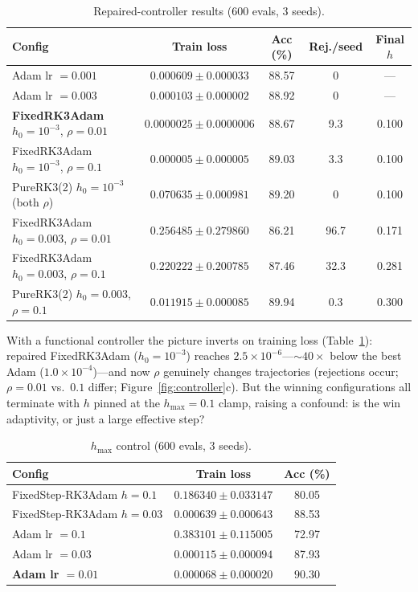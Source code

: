 \documentclass{article}
\newcommand{\hmax}{h_{\max}}
\begin{document}
\begin{table}[t]
\caption{Repaired-controller results (600 evals, 3 seeds).}
\label{tab:repaired}
\vskip 0.1in
\centering
\small
\begin{tabular}{lcccc}
\toprule
Config & Train loss & Acc (\%) & Rej./seed & Final $h$ \\
\midrule
Adam lr $=0.001$ & $0.000609 \pm 0.000033$ & 88.57 & 0 & --- \\
Adam lr $=0.003$ & $0.000103 \pm 0.000002$ & 88.92 & 0 & --- \\
\textbf{FixedRK3Adam} $h_0{=}10^{-3}$, $\rho{=}0.01$ & $\mathbf{0.0000025 \pm 0.0000006}$ & 88.67 & 9.3 & 0.100 \\
FixedRK3Adam $h_0{=}10^{-3}$, $\rho{=}0.1$ & $0.000005 \pm 0.000005$ & 89.03 & 3.3 & 0.100 \\
PureRK3(2) $h_0{=}10^{-3}$ (both $\rho$) & $0.070635 \pm 0.000981$ & 89.20 & 0 & 0.100 \\
FixedRK3Adam $h_0{=}0.003$, $\rho{=}0.01$ & $0.256485 \pm 0.279860$ & 86.21 & 96.7 & 0.171 \\
FixedRK3Adam $h_0{=}0.003$, $\rho{=}0.1$ & $0.220222 \pm 0.200785$ & 87.46 & 32.3 & 0.281 \\
PureRK3(2) $h_0{=}0.003$, $\rho{=}0.1$ & $0.011915 \pm 0.000085$ & 89.94 & 0.3 & 0.300 \\
\bottomrule
\end{tabular}
\vskip -0.1in
\end{table}

With a functional controller the picture inverts on training loss (Table~\ref{tab:repaired}): repaired FixedRK3Adam ($h_0{=}10^{-3}$) reaches $2.5\times 10^{-6}$---${\sim}40\times$ below the best Adam ($1.0{\times}10^{-4}$)---and now $\rho$ genuinely changes trajectories (rejections occur; $\rho{=}0.01$ vs.\ $0.1$ differ; Figure~\ref{fig:controller}c). But the winning configurations all terminate with $h$ pinned at the $\hmax = 0.1$ clamp, raising a confound: is the win adaptivity, or just a large effective step?

\begin{table}[t]
\caption{$\hmax$ control (600 evals, 3 seeds).}
\label{tab:hmaxcontrol}
\vskip 0.1in
\centering
\scriptsize
\setlength{\tabcolsep}{4pt}
\begin{tabular}{lcc}
\toprule
Config & Train loss & Acc (\%) \\
\midrule
FixedStep-RK3Adam $h{=}0.1$ & $0.186340 \pm 0.033147$ & 80.05 \\
FixedStep-RK3Adam $h{=}0.03$ & $0.000639 \pm 0.000643$ & 88.53 \\
Adam lr $=0.1$ & $0.383101 \pm 0.115005$ & 72.97 \\
Adam lr $=0.03$ & $0.000115 \pm 0.000094$ & 87.93 \\
\textbf{Adam lr $=0.01$} & $0.000068 \pm 0.000020$ & $\mathbf{90.30}$ \\
\bottomrule
\end{tabular}
\vskip -0.1in
\end{table}
\end{document}
